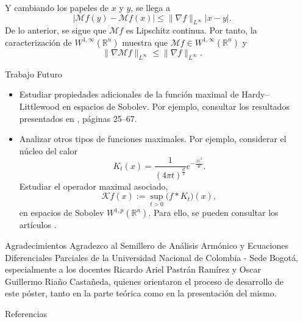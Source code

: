\documentclass[final]{beamer}
\newlength{\sepwidth}
\newlength{\colwidth}
\newcommand{\separatorcolumn}{\begin{column}{\sepwidth}\end{column}}
\begin{document}
\begin{frame}[t]
\begin{columns}[t]
\begin{column}{\colwidth}
\begin{alertblock}{}
\begin{equation*}
      \end{equation*}
      Y cambiando los papeles de $x$ y $y$, se llega a
      \begin{equation*}
      \big|\mathcal{M}f(y)-\mathcal{M}f(x)\big| \leq \|\nabla f\|_{L^{\infty}} |x-y|.    
      \end{equation*}
      De lo anterior, se sigue que $\mathcal{M}f$ es Lipschitz continua. Por tanto, la caracterización de $W^{1,\infty}(\mathbb{R}^{n})$ muestra que $\mathcal{M}f\in W^{1,\infty}(\mathbb{R}^n)$ y
      \begin{equation*}
        \|\nabla \mathcal{M}f\|_{L^{\infty}}\leq \|\nabla f\|_{L^{\infty}}.  
      \end{equation*}
  \end{alertblock}

  \begin{exampleblock}{Trabajo Futuro}
   \begin{itemize}
     \item Estudiar propiedades adicionales de la función maximal de Hardy–Littlewood en espacios de Sobolev. Por ejemplo, consultar los resultados presentados en \cite{Mazya2009}, páginas 25–67.
     \item Analizar otros tipos de funciones maximales. Por ejemplo, considerar el núcleo del calor
     \begin{equation*}
        K_t(x)=\frac{1}{(4\pi t)^{\frac{d}{2}}}e^{-\frac{|x|^2}{4t}}. 
     \end{equation*}
     Estudiar el operador maximal asociado,
     \begin{equation*}
         \mathcal{K} f(x):=\sup_{t>0}\big(f\ast K_t\big)(x),
     \end{equation*}
     en espacios de Sobolev $W^{1,p}(\mathbb{R}^n)$. Para ello, se pueden consultar los artículos \cite{CarneiroFinderSousa2018,CarneiroBenar2013}.
  \end{itemize}
  \end{exampleblock}

  \begin{block}{Agradecimientos}
    Agradezco al Semillero de Análisis Armónico y Ecuaciones Diferenciales Parciales de la Universidad Nacional de Colombia - Sede Bogotá, especialmente a los docentes Ricardo Ariel Pastrán Ramírez y Oscar Guillermo Riaño Castañeda, quienes orientaron el proceso de desarrollo de este póster, tanto en la parte teórica como en la presentación del mismo.
  \end{block}

  \begin{block}{Referencias}

    \nocite{*}
    \footnotesize{
      
      
    }

  \end{block}

\end{column}
\separatorcolumn



\end{columns}
\end{frame}
\end{document}
